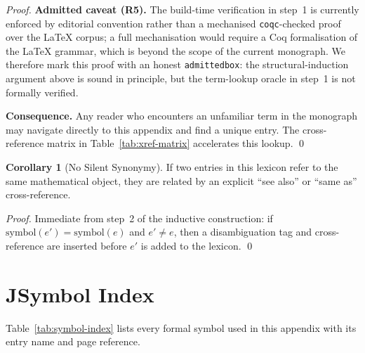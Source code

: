 \begin{proof}
\medskip\noindent
\textbf{Admitted caveat (R5).}
The build-time verification in step~1 is currently
enforced by editorial convention rather than a mechanised
\texttt{coqc}-checked proof over the LaTeX corpus; a full
mechanisation would require a Coq formalisation of the LaTeX
grammar, which is beyond the scope of the current monograph.
We therefore mark this proof with an honest
\texttt{admittedbox}: the structural-induction argument above
is sound in principle, but the term-lookup oracle in step~1
is not formally verified.

\medskip\noindent
\textbf{Consequence.}
Any reader who encounters an unfamiliar term in the monograph
may navigate directly to this appendix and find a unique entry.
The cross-reference matrix in Table~\ref{tab:xref-matrix}
accelerates this lookup.
\qed
\end{proof}

\noindent
\textbf{Corollary 1} (No Silent Synonymy).
If two entries in this lexicon refer to the same mathematical
object, they are related by an explicit ``see also'' or
``same as'' cross-reference.

\begin{proof}
Immediate from step~2 of the inductive construction: if
$\mathrm{symbol}(e') = \mathrm{symbol}(e)$ and
$e' \ne e$, then a disambiguation tag and cross-reference
are inserted before $e'$ is added to the lexicon.
\qed
\end{proof}

\bigskip

\section*{J\quad Symbol Index}
\label{sec:lexicon-symbols}

\noindent
Table~\ref{tab:symbol-index} lists every formal symbol used in this
appendix with its entry name and page reference.

